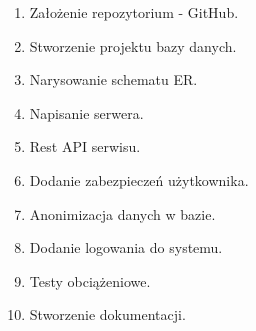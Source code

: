 \begin{enumerate}
    \item Założenie repozytorium - GitHub.
    \item Stworzenie projektu bazy danych.
    \item Narysowanie schematu ER.
    \item Napisanie serwera.
    \item Rest API serwisu.
    \item Dodanie zabezpieczeń użytkownika.
    \item Anonimizacja danych w bazie.
    \item Dodanie logowania do systemu.
    \item Testy obciążeniowe.
    \item Stworzenie dokumentacji.
\end{enumerate}